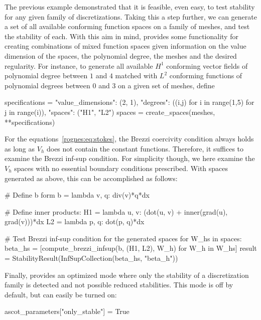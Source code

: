 The previous example demonstrated that it is feasible, even easy, to
test stability for any given family of discretizations. Taking this a
step further, we can generate a set of all available conforming
function spaces on a family of meshes, and test the stability of
each. With this aim in mind, \rognesascot{} provides some
functionality for creating combinations of mixed function spaces given
information on the value dimension of the spaces, the polynomial
degree, the meshes and the desired regularity. For instance, to
generate all available $H^1$ conforming vector fields of polynomial
degree between $1$ and $4$ matched with $L^2$ conforming functions of
polynomial degrees between $0$ and $3$ on a given set of meshes,
define
\begin{python}
  specifications = {"value_dimensions": (2, 1),
                    "degrees": ((i,j) for i in range(1,5) for j in range(i)),
                    "spaces": ("H1", "L2")}
  spaces = create_spaces(meshes, **specifications)
\end{python}

For the equations~\eqref{rognes:eq:stokes}, the Brezzi coercivity
condition always holds as long as $V_h$ does not contain the constant
functions. Therefore, it suffices to examine the Brezzi inf-sup
condition. For simplicity though, we here examine the $V_h$ spaces
with no essential boundary conditions prescribed. With spaces
generated as above, this can be accomplished as follows:
\begin{python}
# Define b form
b = lambda v, q: div(v)*q*dx

# Define inner products:
H1 = lambda u, v: (dot(u, v) + inner(grad(u), grad(v)))*dx
L2 = lambda p, q: dot(p, q)*dx

# Test Brezzi inf-sup condition for the generated spaces
for W_hs in spaces:
    beta_hs = [compute_brezzi_infsup(b, (H1, L2), W_h) for W_h in W_hs]
    result = StabilityResult(InfSupCollection(beta_hs, "beta_h"))
\end{python}
Finally, \rognesascot{} provides an optimized mode where only the
stability of a discretization family is detected and not possible
reduced stabilities. This mode is off by default, but can easily be
turned on:
\begin{python}
 ascot_parameters["only_stable"] = True
\end{python}

